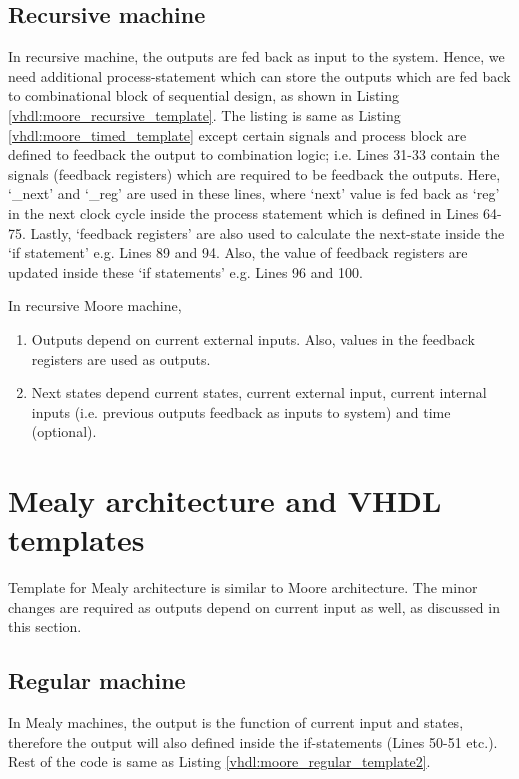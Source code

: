 \subsection{Recursive machine}
In recursive machine, the outputs are fed back as input to the system. Hence, we need additional process-statement which can store the outputs which are fed back to combinational block of sequential design, as shown in Listing \ref{vhdl:moore_recursive_template}. The listing is same as Listing \ref{vhdl:moore_timed_template} except certain signals and process block are defined to feedback the output to combination logic; i.e. Lines 31-33 contain the signals (feedback registers) which are required to be feedback the outputs. Here, `\_next' and `\_reg' are used in these lines, where `next' value is fed back as `reg' in the next clock cycle inside the process statement which is defined in Lines 64-75. Lastly, `feedback registers' are also used to calculate the next-state inside the `if statement' e.g. Lines 89 and 94. Also, the value of feedback registers are updated inside these `if statements' e.g. Lines 96 and 100. 

\begin{noNumBox}
	In recursive Moore machine, 
	\begin{enumerate}
		\item Outputs depend on current external inputs. Also, values in the feedback registers are used as outputs.
		\item Next states depend current states, current external input, current internal inputs (i.e. previous outputs feedback as inputs to system) and time (optional).
	\end{enumerate}
\end{noNumBox}





\section{Mealy architecture and VHDL templates} \label{sec:MealyTemplates}
Template for Mealy architecture is similar to Moore architecture. The minor changes are required as outputs depend on current input as well, as discussed in this section. 
\subsection{Regular machine}
In Mealy machines, the output is the function of current input and states, therefore the output will also defined inside the if-statements (Lines 50-51 etc.). Rest of the code is same as Listing \ref{vhdl:moore_regular_template2}. 



